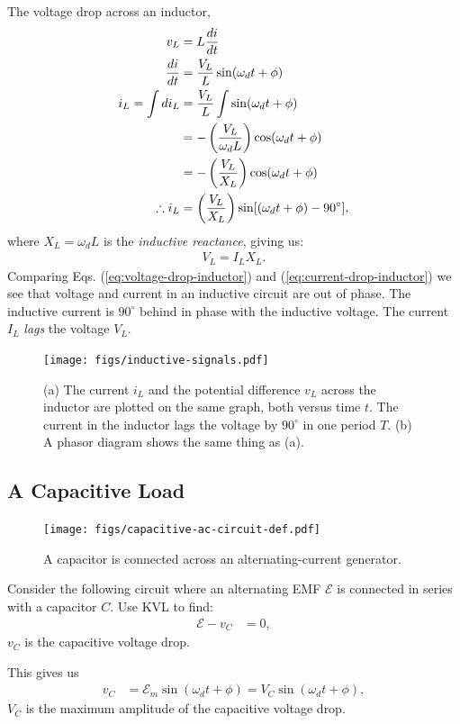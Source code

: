 \documentclass[12pt,b4paper]{article}
\begin{document}
The voltage drop across an inductor,
\begin{align}
    v_L&=L\frac{di}{dt}\notag\\
    \frac{di}{dt}&=\frac{V_L}{L}\sin(\omega_d t+\phi)\notag\\
    i_L=\int di_L&=\frac{V_L}{L}\int \sin(\omega_d t+\phi)\notag\\
    &=-\left(\frac{V_L}{\omega_dL}\right)\cos(\omega_d t+\phi)\notag\\
    &=-\left(\frac{V_L}{X_L}\right)\cos(\omega_d t+\phi)\notag\\
    \therefore i_L&=\left(\frac{V_L}{X_L}\right)\sin[(\omega_d t+\phi)-90^\circ],\label{eq:current-drop-inductor}
\end{align}
where $X_L=\omega_dL$ is the \textit{inductive reactance}, giving us:
\begin{align}
    V_L=I_LX_L.
\end{align}
Comparing Eqs. (\ref{eq:voltage-drop-inductor}) and (\ref{eq:current-drop-inductor}) we see that voltage and current in an inductive circuit are out of phase. The inductive current is $90^\circ$ behind in phase with the inductive voltage. The current $I_L$ \textit{lags} the voltage $V_L$.
\begin{figure}[H]
    \centering
    \texttt{[image: figs/inductive-signals.pdf]}
    \caption{(a) The current $i_L$ and the potential difference $v_L$ across the inductor are plotted on the same graph, both versus time $t$. The current in the inductor lags the voltage by $90^\circ$ in one period $T$. (b) A phasor diagram shows the same thing as (a).}
    \label{fig:inductive-signals}
\end{figure}
\subsection*{A Capacitive Load}
\begin{figure}[H]
    \centering
    \texttt{[image: figs/capacitive-ac-circuit-def.pdf]}
    \caption{A capacitor is connected across an alternating-current generator.}
    \label{fig:capcitive-ac-circuit-def}
\end{figure}
Consider the following circuit where an alternating EMF $\mathcal{E}$ is connected in series with a capacitor $C$. Use KVL to find:
\begin{align}
    \mathcal{E}-v_C&=0,
\end{align}
$v_C$ is the capacitive voltage drop.

This gives us 
\begin{align}
    v_C&=\mathcal{E}_m\sin(\omega_d t+\phi)=V_C\sin(\omega_d t+\phi),\label{eq:voltage-drop-capacitor}
\end{align}
$V_C$ is the maximum amplitude of the capacitive voltage drop.
\end{document}
